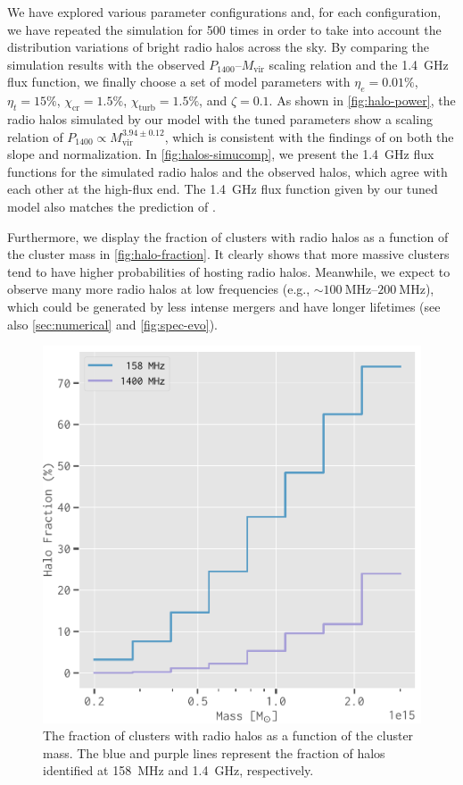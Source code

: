\documentclass[twocolumn]{aastex62}
\newcommand{\R}[1]{\mathrm{#1}}
\begin{document}
We have explored various parameter configurations and,
for each configuration, we have repeated the simulation for 500 times
in order to take into account the distribution variations of bright
radio halos across the sky.
By comparing the simulation results with the observed
$P_{1400}$--$M_{\R{vir}}$ scaling relation and the \SI{1.4}{\GHz} flux
function, we finally choose a set of model parameters with
$\eta_e = 0.01\%$,
$\eta_t = 15\%$,
$\chi_{\R{cr}} = 1.5\%$,
$\chi_{\R{turb}} = 1.5\%$,
and $\zeta = 0.1$.
As shown in \autoref{fig:halo-power}, the radio halos simulated by our
model with the tuned parameters show a scaling relation of $P_{1400}
\propto M_{\R{vir}}^{3.94 \pm 0.12}$, which is consistent with the
findings of \citet{cassano2013} on both the slope and normalization.
In \autoref{fig:halos-simucomp}, we present the \SI{1.4}{\GHz} flux
functions for the simulated radio halos and the observed halos,
which agree with each other at the high-flux end.
The \SI{1.4}{\GHz} flux function given by our tuned model also matches
the prediction of \citet{cassano2012}.

Furthermore, we display the fraction of clusters with radio halos as a
function of the cluster mass in \autoref{fig:halo-fraction}.
It clearly shows that more massive clusters tend to have higher
probabilities of hosting radio halos.
Meanwhile, we expect to observe many more radio halos at low
frequencies (e.g., $\sim \SIrange{100}{200}{\MHz}$), which could be
generated by less intense mergers and have longer lifetimes (see also
\autoref{sec:numerical} and \autoref{fig:spec-evo}).

\begin{figure}
  \centering
  \includegraphics[width=\columnwidth]{halo-fraction}
  \caption{\label{fig:halo-fraction}%
    The fraction of clusters with radio halos as a function of the cluster
    mass.
    The blue and purple lines represent the fraction of halos identified at
    \SI{158}{\MHz} and \SI{1.4}{\GHz}, respectively.
  }
\end{figure}
\end{document}
